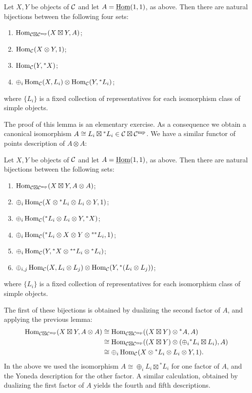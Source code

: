\documentclass{amsart}
\begin{document}
\begin{lemma}
	Let $X,Y$ be objects of $\mathcal C$ and let $A = \operatorname{\underline{Hom}}(1,1)$, as above. Then there are natural bijections between the following four sets:
	\begin{enumerate}
		\item $\operatorname{Hom}_{\mathcal C \boxtimes \mathcal C^{\mathrm{mp}}}(X \boxtimes Y, A)$; 
		\item $\operatorname{Hom}_{\mathcal C}(X \otimes Y, 1)$;
		\item $\operatorname{Hom}_{\mathcal C}(Y, {}^*X)$;
		\item $\oplus_i \operatorname{Hom}_{\mathcal C}(X, L_i) \otimes \operatorname{Hom}_{\mathcal C}(Y, {}^*L_i)$;
	\end{enumerate}
	where $\{L_i\}$ is a fixed collection of representatives for each isomorphism class of simple objects. 
\end{lemma}

\noindent The proof of this lemma is an elementary exercise. As a consequence we obtain a canonical isomorphism $A \cong L_i \boxtimes {}^*L_i \in \mathcal C \boxtimes \mathcal C^{\mathrm{mp}}$. We have a similar functor of points description of $A \otimes A$:

\begin{lemma}
	Let $X,Y$ be objects of $\mathcal C$ and let $A = \operatorname{\underline{Hom}}(1,1)$, as above. Then there are natural bijections between the following sets:
	\begin{enumerate}
		\item $\operatorname{Hom}_{\mathcal C \boxtimes \mathcal C^{\mathrm{mp}}}(X \boxtimes Y, A \otimes A)$;
		\item $\oplus_i \operatorname{Hom}_{\mathcal C}( X \otimes {}^*L_i \otimes L_i \otimes Y, 1)$;
		\item $\oplus_i \operatorname{Hom}_{\mathcal C}({}^*L_i \otimes L_i \otimes Y, {}^*X)$;
		\item $\oplus_i \operatorname{Hom}_{\mathcal C}( {}^*L_i \otimes X \otimes Y \otimes {}^{**}L_i, 1)$;
		\item $\oplus_i \operatorname{Hom}_{\mathcal C}(  Y, {}^*X \otimes {}^{**}L_i  \otimes {}^*L_i)$;
		\item $\oplus_{i,j} \operatorname{Hom}_{\mathcal C}(X, L_i \otimes L_j) \otimes \operatorname{Hom}_{\mathcal C}(Y, {}^*(L_i \otimes L_j))$;
	\end{enumerate}
	where $\{L_i\}$ is a fixed collection of representatives for each isomorphism class of simple objects. 
\end{lemma}

\noindent The first of these bijections is obtained by dualizing the second factor of $A$, and applying the previous lemma:  
\begin{align*}
	\operatorname{Hom}_{\mathcal C \boxtimes \mathcal C^{\mathrm{mp}}}(X \boxtimes Y, A \otimes A) &\cong \operatorname{Hom}_{\mathcal C \boxtimes \mathcal C^{\mathrm{mp}}}((X \boxtimes Y) \otimes {}^*A, A) \\
	&\cong \operatorname{Hom}_{\mathcal C \boxtimes \mathcal C^{\mathrm{mp}}}((X \boxtimes Y) \otimes (\oplus_i {}^*L_i \boxtimes L_i), A) \\
	&\cong \oplus_i \operatorname{Hom}_{\mathcal C}( X \otimes {}^*L_i \otimes L_i \otimes Y, 1).
\end{align*}
In the above we used the isomorphism $A \cong \oplus_i L_i \boxtimes {}^*L_i$ for one factor of $A$, and the Yoneda description for the other factor. A similar calculation, obtained by dualizing the first factor of $A$ yields the fourth and fifth descriptions. 
\end{document}
